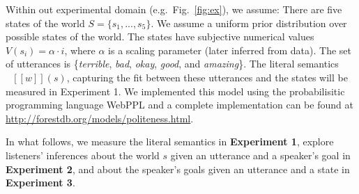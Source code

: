 \documentclass[10pt,letterpaper]{article}
\newcommand{\denote}[1]{\mbox{ $[\![ #1 ]\!]$}}
\newcommand{\mht}[1]{\textcolor{DarkOrange}{[mht: #1]}}
\newcommand{\ejy}[1]{\textcolor{Blue}{[ejy: #1]}}
\begin{document}
%

Within out experimental domain (e.g.~Fig.~\ref{fig:ex}), we assume: There are five states of the world $S = \{s_{1}, ...,  s_{5}\}$.
We assume a uniform prior distribution over possible states of the world.
The states have subjective numerical values $V(s_{i}) = \alpha \cdot i$, where $\alpha$ is a scaling parameter (later inferred from data).
The set of utterances is \{\emph{terrible}, \emph{bad}, \emph{okay}, \emph{good}, and \emph{amazing}\}.
The literal semantics $\denote{w}(s)$, capturing the fit between these utterances and the states will be measured in Experiment 1.
We implemented this model using the probabilisitic programming language WebPPL \cite{dippl} and a complete implementation can be found at \url{http://forestdb.org/models/politeness.html}.

In what follows, we measure the literal semantics in \textbf{Experiment 1}, explore listeners' inferences about the world $s$ given an utterance and a speaker's goal in \textbf{Experiment 2}, and about the speaker's goals given an utterance and a state in \textbf{Experiment 3}.
\end{document}

